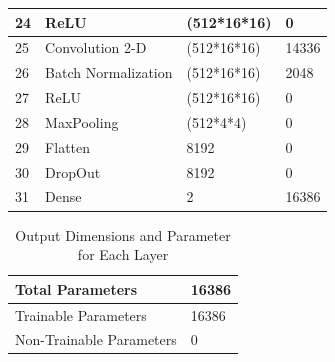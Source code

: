 \begin{table}
\begin{tabular}{|l|l|l|l|}
		24 & ReLU & (512*16*16) & 0 \\                       \hline
		25 & Convolution 2-D & (512*16*16) & 14336 \\        \hline
		26 & Batch Normalization & (512*16*16) & 2048 \\     \hline
		27 & ReLU & (512*16*16) & 0 \\                       \hline
		28 & MaxPooling & (512*4*4) & 0 \\                   \hline
		29 & Flatten & 8192 & 0 \\                           \hline
		30 & DropOut & 8192 & 0 \\                           \hline
		31 & Dense & 2 & 16386 \\\hline
		\end{tabular}
	\end{table}

	\begin{table}[hbt!]
		\begin{tabularx}{1.03\textwidth}{|X|X|}
			\hline
			Total Parameters & 16386 \\ \hline
			Trainable Parameters & 16386 \\  \hline
			Non-Trainable Parameters & 0 \\ \hline
		\end{tabularx}
		\caption{Output Dimensions and Parameter for Each Layer}
	\end{table}
        
        
        
        
